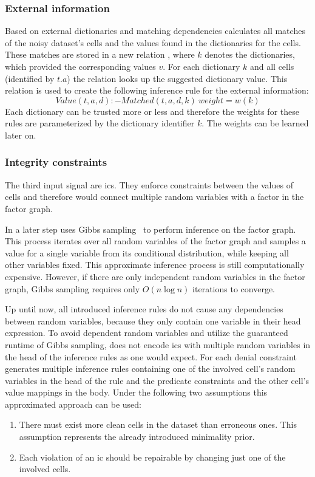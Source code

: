   \subsubsection*{External information}
  Based on external dictionaries and matching dependencies \holoclean{} calculates all matches of the noisy dataset's cells and the values found in the dictionaries for the cells.
  These matches are stored in a new relation , where $k$ denotes the dictionaries, which provided the corresponding values $v$.
  For each dictionary $k$ and all cells (identified by $t.a$) the relation  looks up the suggested dictionary value.
  This relation is used to create the following inference rule for the external information:
  \begin{equation}
    Value(t,a,d):-Matched(t,a,d,k)\ weight=w(k)\label{equ:matching}
  \end{equation}
  Each dictionary can be trusted more or less and therefore the weights for these rules are parameterized by the dictionary identifier $k$.
  The weights can be learned later on.

  \subsubsection*{Integrity constraints}
  The third input signal are \glspl{ic}.
  They enforce constraints between the values of cells and therefore would connect multiple random variables with a factor in the factor graph.
  
  In a later step \holoclean{} uses Gibbs sampling~\cite{gibbssampling} to perform inference on the factor graph.
  This process iterates over all random variables of the factor graph and samples a value for a single variable from its conditional distribution, while keeping all other variables fixed.
  This approximate inference process is still computationally expensive.
  However, if there are only independent random variables in the factor graph, Gibbs sampling requires only $O(n \log n)$ iterations to converge.
  
  Up until now, all introduced inference rules do not cause any dependencies between random variables, because they only contain one variable in their head expression.
  To avoid dependent random variables and utilize the guaranteed runtime of Gibbs sampling, \holoclean{} does not encode \glspl{ic} with multiple random variables in the head of the inference rules as one would expect.
  For each denial constraint \holoclean{} generates multiple inference rules containing one of the involved cell's random variables in the head of the rule and the predicate constraints and the other cell's value mappings in the body.
  Under the following two assumptions this approximated approach can be used:
  \begin{enumerate}
    \item There must exist more clean cells in the dataset than erroneous ones. This assumption represents the already introduced minimality prior.
    \item Each violation of an \gls{ic} should be repairable by changing just one of the involved cells.
  \end{enumerate}
  
